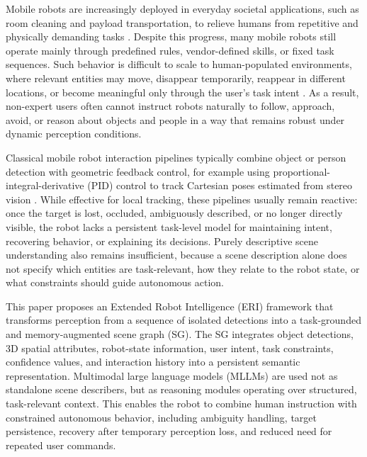 \documentclass[lettersize,journal]{IEEEtran}
\begin{document}
Mobile robots are increasingly deployed in everyday societal applications, such as room cleaning and payload transportation, to relieve humans from repetitive and physically demanding tasks \cite{gona2024intelligent,kaigom2023metarobotics,konnecke2024,la2024toward}. Despite this progress, many mobile robots still operate mainly through predefined rules, vendor-defined skills, or fixed task sequences. Such behavior is difficult to scale to human-populated environments, where relevant entities may move, disappear temporarily, reappear in different locations, or become meaningful only through the user’s task intent \cite{kruger2019programming,ajoudani2018progress,beetz2018knowrob,pedersen2016robotics}. As a result, non-expert users often cannot instruct robots naturally to follow, approach, avoid, or reason about objects and people in a way that remains robust under dynamic perception conditions.

Classical mobile robot interaction pipelines typically combine object or person detection with geometric feedback control, for example using proportional-integral-derivative (PID) control to track Cartesian poses estimated from stereo vision \cite{chen2020vision,wu2021person,li2022robust}. While effective for local tracking, these pipelines usually remain reactive: once the target is lost, occluded, ambiguously described, or no longer directly visible, the robot lacks a persistent task-level model for maintaining intent, recovering behavior, or explaining its decisions. Purely descriptive scene understanding also remains insufficient, because a scene description alone does not specify which entities are task-relevant, how they relate to the robot state, or what constraints should guide autonomous action.

This paper proposes an Extended Robot Intelligence (ERI) framework that transforms perception from a sequence of isolated detections into a task-grounded and memory-augmented scene graph (SG). The SG integrates object detections, 3D spatial attributes, robot-state information, user intent, task constraints, confidence values, and interaction history into a persistent semantic representation. Multimodal large language models (MLLMs) \cite{gupta2023vlmaps,huang2023vlfm,konishi2023navgpt} are used not as standalone scene describers, but as reasoning modules operating over structured, task-relevant context. This enables the robot to combine human instruction with constrained autonomous behavior, including ambiguity handling, target persistence, recovery after temporary perception loss, and reduced need for repeated user commands.
\end{document}
